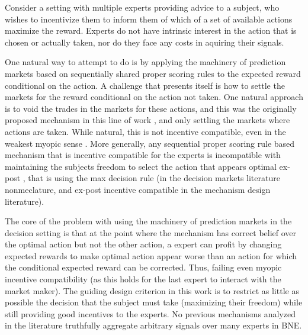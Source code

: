 
Consider a setting with multiple experts providing advice to a subject, who wishes to incentivize them to inform them of which of a set of available actions maximize the reward.
Experts do not have intrinsic interest in the action that is chosen or actually taken, nor do they face any costs in aquiring their signals.

One natural way to attempt to do is by applying the machinery of prediction markets based on sequentially shared proper scoring rules to the expected reward conditional on the action. 
A challenge that presents itself is how to settle the markets for the reward conditional on the action not taken.
One natural approach is to void the trades in the markets for these actions, and this was the originally proposed mechanism in this line of work \cite{hanson2002decision}, and only settling the markets where actions are taken.
While natural, this is not incentive compatible, even in the weakest myopic sense \cite{othman2010decision}. 
More generally, any sequential proper scoring rule based mechanism that is incentive compatible for the experts is incompatible with maintaining the subjects freedom to select the action that appears optimal ex-post \cite{othman2010decision,  chen2014eliciting}, that is using the max decision rule (in the decision markets literature nonmeclature, and ex-post incentive compatible in the mechanism design literature). 

The core of the problem with using the machinery of prediction markets in the decision setting is that at the point where the mechanism has correct belief over the optimal action but not the other action, a expert  can profit by changing expected rewards to make optimal action appear worse than an action for which the conditional expected reward can be corrected. Thus, failing even myopic incentive compatibility (as this holds for the last expert to interact with the market maker).
The guiding design criterion in this work is to restrict as little as possible the decision that the subject must take (maximizing their freedom) while still providing good incentives to the experts. No previous mechanisms analyzed in the literature truthfully aggregate arbitrary signals over many experts in BNE. 

